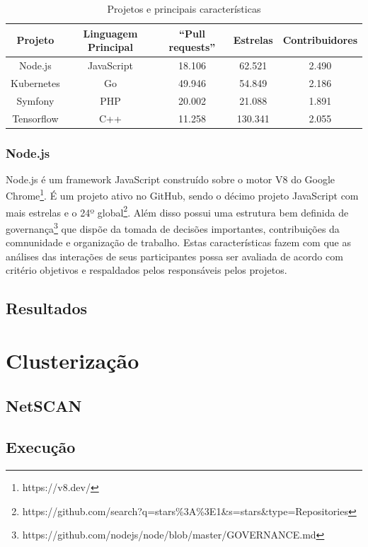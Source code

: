 \documentclass[12pt,openany,oneside,a4paper,english,brazil]{abntbibufjf}
\begin{document}
  \begin{table}[htbp]
  \caption{Projetos e principais características}
  \begin{center}
  \begin{tabular}{|c|c|c|c|c|}
  \hline
  \textbf{Projeto} & \textbf{Linguagem Principal} & \textbf{``Pull requests''}& \textbf{Estrelas}& \textbf{Contribuidores} \\
  \hline
  Node.js & JavaScript & 18.106 & 62.521 & 2.490 \\
  Kubernetes & Go & 49.946 & 54.849 & 2.186 \\
  Symfony & PHP & 20.002 & 21.088 & 1.891 \\
  Tensorflow & C++ & 11.258 & 130.341 & 2.055 \\
  \hline
  \end{tabular}
  \label{tab:sizemetrics}
  \end{center}
  \end{table}

  \subsubsection{Node.js}

  Node.js é um framework JavaScript construído sobre o motor V8 do Google Chrome\footnote{https://v8.dev/}. É um projeto ativo no GitHub, sendo o décimo projeto JavaScript com mais estrelas e o 24º global\footnote{https://github.com/search?q=stars\%3A\%3E1\&s=stars\&type=Repositories}. Além disso possui uma estrutura bem definida de governança\footnote{https://github.com/nodejs/node/blob/master/GOVERNANCE.md} que dispõe da tomada de decisões importantes, contribuições da comnunidade e organização de trabalho. Estas características fazem com que as análises das interações de seus participantes possa ser avaliada de acordo com critério objetivos e respaldados pelos responsáveis pelos projetos.




  \subsection{Resultados}
\section{Clusterização}
  \subsection{NetSCAN}
  \subsection{Execução}
\end{document}
